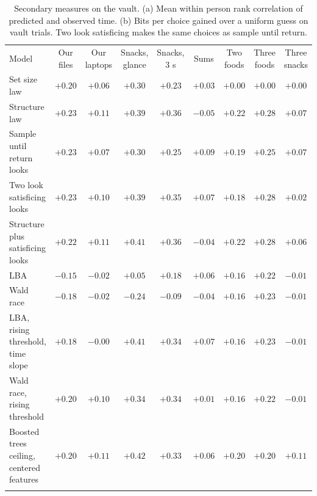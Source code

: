 \begin{table}[t]
\centering
\footnotesize
\setlength{\tabcolsep}{3pt}
\caption{Secondary measures on the vault. (a) Mean within person rank correlation of predicted and observed time. (b) Bits per choice gained over a uniform guess on vault trials. Two look satisficing makes the same choices as sample until return.}
\label{tab:secondary}
\begin{tabular}{>{\raggedright\arraybackslash}p{4.4cm}cccccccc}
\toprule
\multicolumn{9}{l}{(a) Rank correlation with time} \\
\midrule
Model & \makecell{Our\\files} & \makecell{Our\\laptops} & \makecell{Snacks,\\glance} & \makecell{Snacks,\\3 s} & Sums & \makecell{Two\\foods} & \makecell{Three\\foods} & \makecell{Three\\snacks} \\
\midrule
Set size law & $+0.20$ & $+0.06$ & $+0.30$ & $+0.23$ & $+0.03$ & $+0.00$ & $+0.00$ & $+0.00$ \\
Structure law & $+0.23$ & $+0.11$ & $+0.39$ & $+0.36$ & $-0.05$ & $+0.22$ & $+0.28$ & $+0.07$ \\
Sample until return looks & $+0.23$ & $+0.07$ & $+0.30$ & $+0.25$ & $+0.09$ & $+0.19$ & $+0.25$ & $+0.07$ \\
Two look satisficing looks & $+0.23$ & $+0.10$ & $+0.39$ & $+0.35$ & $+0.07$ & $+0.18$ & $+0.28$ & $+0.02$ \\
Structure plus satisficing looks & $+0.22$ & $+0.11$ & $+0.41$ & $+0.36$ & $-0.04$ & $+0.22$ & $+0.28$ & $+0.06$ \\
LBA & $-0.15$ & $-0.02$ & $+0.05$ & $+0.18$ & $+0.06$ & $+0.16$ & $+0.22$ & $-0.01$ \\
Wald race & $-0.18$ & $-0.02$ & $-0.24$ & $-0.09$ & $-0.04$ & $+0.16$ & $+0.23$ & $-0.01$ \\
LBA, rising threshold, time slope & $+0.18$ & $-0.00$ & $+0.41$ & $+0.34$ & $+0.07$ & $+0.16$ & $+0.23$ & $-0.01$ \\
Wald race, rising threshold & $+0.20$ & $+0.10$ & $+0.34$ & $+0.34$ & $+0.01$ & $+0.16$ & $+0.22$ & $-0.01$ \\
Boosted trees ceiling, centered features & $+0.20$ & $+0.11$ & $+0.42$ & $+0.33$ & $+0.06$ & $+0.20$ & $+0.20$ & $+0.11$ \\
\midrule
\multicolumn{9}{l}{(b) Choices, bits per choice above a uniform guess} \\

\end{tabular}
\end{table}
